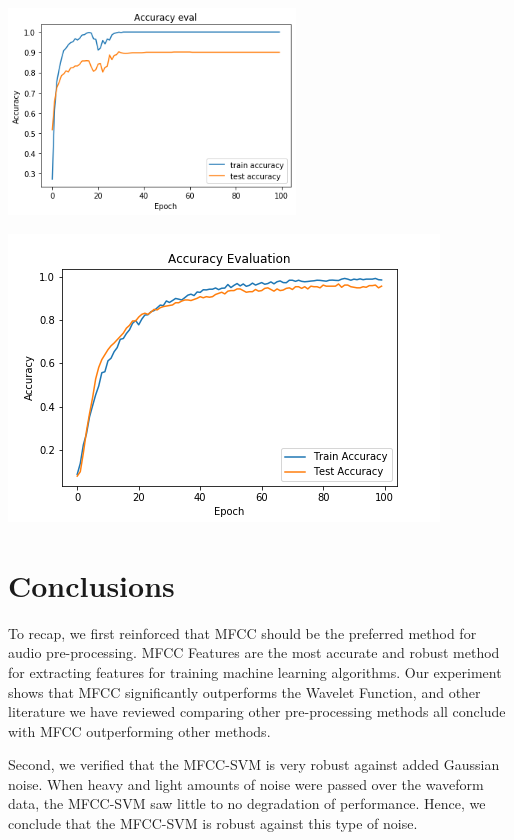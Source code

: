 \documentclass[12pt]{article}
\begin{document}
\begin{multicols*}{2}
{
    \centering
    \includegraphics[width=3in]{figures/mlp_accuracy_plot2.png}
    \label{mlp_accuracy}
}

{
    \centering
    \includegraphics[width=\linewidth]{figures/cnn_initial_accuracy.png}
    \label{cnn_accuracy}
}

\section*{Conclusions}
To recap, we first reinforced that MFCC should be the preferred method for audio pre-processing. MFCC Features are the most accurate and robust method for extracting features for training machine learning algorithms. Our experiment shows that MFCC significantly outperforms the Wavelet Function, and other literature we have reviewed comparing other pre-processing methods all conclude with MFCC outperforming other methods.

Second, we verified that the MFCC-SVM is very robust against added Gaussian noise. When heavy and light amounts of noise were passed over the waveform data, the MFCC-SVM saw little to no degradation of performance. Hence, we conclude that the MFCC-SVM is robust against this type of noise.


\end{multicols*}
\end{document}
